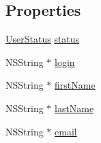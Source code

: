 \subsection*{Properties}
\begin{DoxyCompactItemize}
\item 
\hyperlink{interface_w_user_a5e79d8246a2ab96a7280c1d7aa5819d5}{User\-Status} \hyperlink{interface_w_user_a5b93eafb209fdaeeb14343048da38c2a}{status}
\item 
N\-S\-String $\ast$ \hyperlink{interface_w_user_acb79e445d2ad7977e3e2e83ac874a9fa}{login}
\item 
N\-S\-String $\ast$ \hyperlink{interface_w_user_a2e8310e8c82f1dddaeb5f9b40d4ca848}{first\-Name}
\item 
N\-S\-String $\ast$ \hyperlink{interface_w_user_ae1605e1fc15b19f7010b511e9840dc82}{last\-Name}
\item 
N\-S\-String $\ast$ \hyperlink{interface_w_user_a16d6ebfd4831a4b06c8c06deb92ea6a8}{email}
\end{DoxyCompactItemize}


